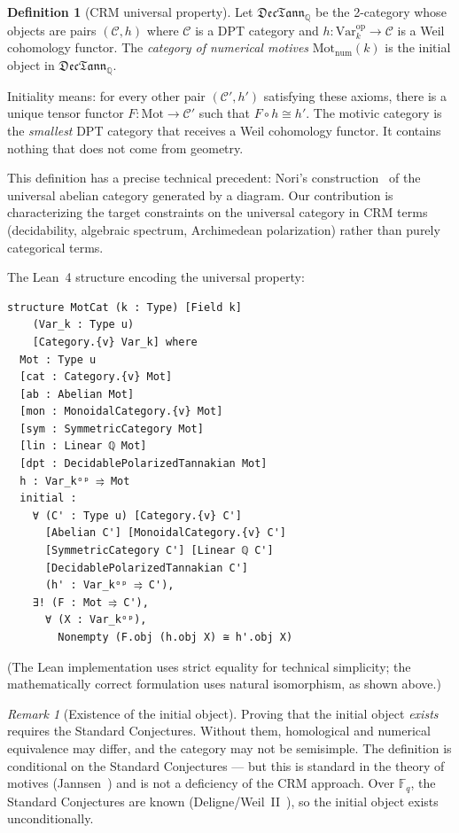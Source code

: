 \documentclass[11pt]{article}
\theoremstyle{definition}
\newtheorem{definition}[theorem]{Definition}
\theoremstyle{remark}
\newtheorem{remark}[theorem]{Remark}
\newcommand{\Q}{\mathbb{Q}}
\newcommand{\Fq}{\mathbb{F}_q}
\newcommand{\CRM}{\mathrm{CRM}}
\begin{document}
\begin{definition}[CRM universal property]
Let $\mathfrak{DecTann}_\Q$ be the 2-category whose objects are pairs $(\mathcal{C}, h)$ where $\mathcal{C}$ is a DPT category and $h : \mathrm{Var}_k^{\mathrm{op}} \to \mathcal{C}$ is a Weil cohomology functor. The \emph{category of numerical motives} $\mathrm{Mot}_{\mathrm{num}}(k)$ is the initial object in $\mathfrak{DecTann}_\Q$.
\end{definition}

Initiality means: for every other pair $(\mathcal{C}', h')$ satisfying these axioms, there is a unique tensor functor $F : \mathrm{Mot} \to \mathcal{C}'$ such that $F \circ h \cong h'$. The motivic category is the \emph{smallest} DPT category that receives a Weil cohomology functor. It contains nothing that does not come from geometry.

This definition has a precise technical precedent: Nori's construction~\cite{Nori2002} of the universal abelian category generated by a diagram. Our contribution is characterizing the target constraints on the universal category in $\CRM$ terms (decidability, algebraic spectrum, Archimedean polarization) rather than purely categorical terms.

The Lean~4 structure encoding the universal property:

\begin{lstlisting}
structure MotCat (k : Type) [Field k]
    (Var_k : Type u)
    [Category.{v} Var_k] where
  Mot : Type u
  [cat : Category.{v} Mot]
  [ab : Abelian Mot]
  [mon : MonoidalCategory.{v} Mot]
  [sym : SymmetricCategory Mot]
  [lin : Linear ℚ Mot]
  [dpt : DecidablePolarizedTannakian Mot]
  h : Var_kᵒᵖ ⥤ Mot
  initial :
    ∀ (C' : Type u) [Category.{v} C']
      [Abelian C'] [MonoidalCategory.{v} C']
      [SymmetricCategory C'] [Linear ℚ C']
      [DecidablePolarizedTannakian C']
      (h' : Var_kᵒᵖ ⥤ C'),
    ∃! (F : Mot ⥤ C'),
      ∀ (X : Var_kᵒᵖ),
        Nonempty (F.obj (h.obj X) ≅ h'.obj X)
\end{lstlisting}

\noindent (The Lean implementation uses strict equality for technical simplicity; the mathematically correct formulation uses natural isomorphism, as shown above.)

\begin{remark}[Existence of the initial object]
Proving that the initial object \emph{exists} requires the Standard Conjectures. Without them, homological and numerical equivalence may differ, and the category may not be semisimple. The definition is conditional on the Standard Conjectures --- but this is standard in the theory of motives (Jannsen~\cite{Jannsen1992}) and is not a deficiency of the $\CRM$ approach. Over $\Fq$, the Standard Conjectures are known (Deligne/Weil~II~\cite{Deligne1980}), so the initial object exists unconditionally.
\end{remark}
\end{document}
